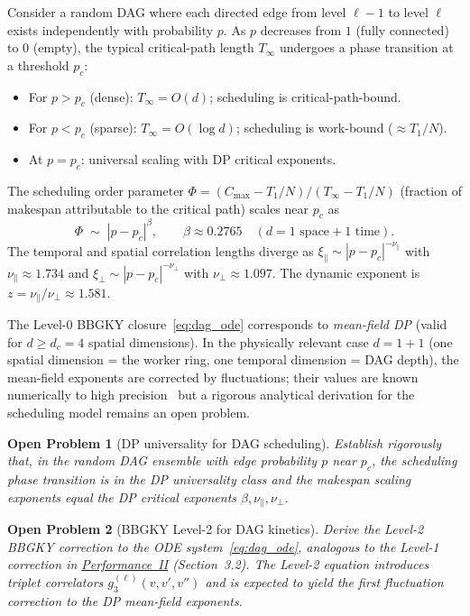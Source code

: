 \documentclass[11pt,a4paper]{report}
\newtheorem{openq}{Open Problem}[section]
\begin{document}
Consider a random DAG where each directed edge from level $\ell{-}1$
to level $\ell$ exists independently with probability $p$.
As $p$ decreases from $1$ (fully connected) to $0$ (empty), the
typical critical-path length $T_\infty$ undergoes a phase transition
at a threshold $p_c$:
\begin{itemize}
  \item For $p > p_c$ (dense): $T_\infty = O(d)$; scheduling is
        critical-path-bound.
  \item For $p < p_c$ (sparse): $T_\infty = O(\log d)$; scheduling is
        work-bound ($\approx T_1/N$).
  \item At $p = p_c$: universal scaling with DP critical exponents.
\end{itemize}
The scheduling order parameter
$\Phi = (C_{\max} - T_1/N)/(T_\infty - T_1/N)$
(fraction of makespan attributable to the critical path)
scales near $p_c$ as~\cite{hinrichsen2000}
\[
  \Phi \;\sim\; |p - p_c|^{\beta},
  \qquad
  \beta \approx 0.2765 \quad (d=1\text{ space} + 1\text{ time}).
\]
The temporal and spatial correlation lengths diverge as
$\xi_\parallel \sim |p-p_c|^{-\nu_\parallel}$ with $\nu_\parallel \approx 1.734$
and $\xi_\perp \sim |p-p_c|^{-\nu_\perp}$ with $\nu_\perp \approx 1.097$.
The dynamic exponent is $z = \nu_\parallel/\nu_\perp \approx 1.581$.

The Level-0 BBGKY closure~\eqref{eq:dag_ode} corresponds to
\emph{mean-field DP} (valid for $d \geq d_c = 4$ spatial dimensions).
In the physically relevant case $d = 1+1$ (one spatial dimension = the
worker ring, one temporal dimension = DAG depth), the mean-field exponents
are corrected by fluctuations; their values are known numerically to high
precision~\cite{hinrichsen2000} but a rigorous analytical derivation for
the scheduling model remains an open problem.

\begin{openq}[DP universality for DAG scheduling]
Establish rigorously that, in the random DAG ensemble with edge probability
$p$ near $p_c$, the scheduling phase transition is in the DP universality
class and the makespan scaling exponents equal the DP critical exponents
$\beta, \nu_\parallel, \nu_\perp$.
\end{openq}

\begin{openq}[BBGKY Level-2 for DAG kinetics]
Derive the Level-2 BBGKY correction to the ODE system~\eqref{eq:dag_ode},
analogous to the Level-1 correction in
\hyperref[chap:kinetic_theory]{Performance~II} (Section~3.2).
The Level-2 equation introduces triplet correlators
$g_3^{(\ell)}(v,v',v'')$ and is expected to yield the first
fluctuation correction to the DP mean-field exponents.
\end{openq}
\end{document}
